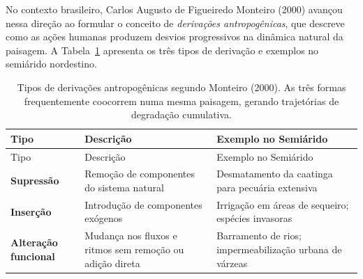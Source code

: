 \documentclass[
  portuguese,
  11pt,
  a4paper,
  open=any]{scrbook}
\begin{document}
No contexto brasileiro, Carlos Augusto de Figueiredo Monteiro (2000)
avançou nessa direção ao formular o conceito de \emph{derivações
antropogênicas}, que descreve como as ações humanas produzem desvios
progressivos na dinâmica natural da paisagem. A
Tabela~\ref{tbl-derivacoes-monteiro} apresenta os três tipos de
derivação e exemplos no semiárido nordestino.

\begin{longtable}[]{@{}
  >{\raggedright\arraybackslash}p{}
  >{\raggedright\arraybackslash}p{}
  >{\raggedright\arraybackslash}p{}@{}}
\caption{Tipos de derivações antropogênicas segundo Monteiro (2000). As
três formas frequentemente coocorrem numa mesma paisagem, gerando
trajetórias de degradação
cumulativa.}\label{tbl-derivacoes-monteiro}\tabularnewline
\toprule\noalign{}
\begin{minipage}[b]{\linewidth}\raggedright
Tipo
\end{minipage} & \begin{minipage}[b]{\linewidth}\raggedright
Descrição
\end{minipage} & \begin{minipage}[b]{\linewidth}\raggedright
Exemplo no Semiárido
\end{minipage} \\
\midrule\noalign{}
\endfirsthead
\toprule\noalign{}
\begin{minipage}[b]{\linewidth}\raggedright
Tipo
\end{minipage} & \begin{minipage}[b]{\linewidth}\raggedright
Descrição
\end{minipage} & \begin{minipage}[b]{\linewidth}\raggedright
Exemplo no Semiárido
\end{minipage} \\
\midrule\noalign{}
\endhead
\bottomrule\noalign{}
\endlastfoot
\textbf{Supressão} & Remoção de componentes do sistema natural &
Desmatamento da caatinga para pecuária extensiva \\
\textbf{Inserção} & Introdução de componentes exógenos & Irrigação em
áreas de sequeiro; espécies invasoras \\
\textbf{Alteração funcional} & Mudança nos fluxos e ritmos sem remoção
ou adição direta & Barramento de rios; impermeabilização urbana de
várzeas \\
\end{longtable}
\end{document}
